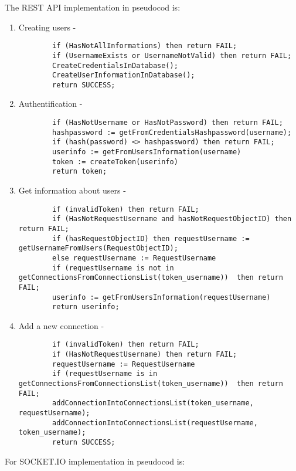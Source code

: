 The REST API implementation in pseudocod is:
\begin{enumerate}
    \item Creating users - 
    \begin{lstlisting}
        if (HasNotAllInformations) then return FAIL;
        if (UsernameExists or UsernameNotValid) then return FAIL;
        CreateCredentialsInDatabase();
        CreateUserInformationInDatabase();
        return SUCCESS;
    \end{lstlisting}
    \item Authentification -
    \begin{lstlisting}
        if (HasNotUsername or HasNotPassword) then return FAIL;
        hashpassword := getFromCredentialsHashpassword(username);
        if (hash(password) <> hashpassword) then return FAIL;
        userinfo := getFromUsersInformation(username)
        token := createToken(userinfo)
        return token;
    \end{lstlisting}
    \item Get information about users - 
    \begin{lstlisting}
        if (invalidToken) then return FAIL;
        if (HasNotRequestUsername and hasNotRequestObjectID) then return FAIL;
        if (hasRequestObjectID) then requestUsername := getUsernameFromUsers(RequestObjectID);
        else requestUsername := RequestUsername
        if (requestUsername is not in getConnectionsFromConnectionsList(token_username))  then return FAIL;
        userinfo := getFromUsersInformation(requestUsername)
        return userinfo;
    \end{lstlisting}
    \item Add a new connection - 
    \begin{lstlisting}
        if (invalidToken) then return FAIL;
        if (HasNotRequestUsername) then return FAIL;
        requestUsername := RequestUsername
        if (requestUsername is in getConnectionsFromConnectionsList(token_username))  then return FAIL;
        addConnectionIntoConnectionsList(token_username, requestUsername);
        addConnectionIntoConnectionsList(requestUsername, token_username);
        return SUCCESS;
    \end{lstlisting}
\end{enumerate}
For SOCKET.IO implementation in pseudocod is:
